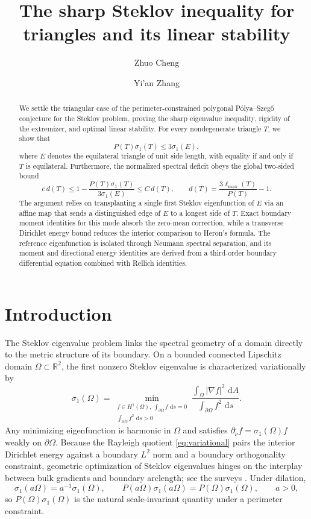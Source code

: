 \documentclass[11pt,reqno]{amsart}
\title[A sharp Steklov inequality for triangles]{The sharp Steklov inequality for triangles and its linear stability}
\author{Zhuo Cheng}
\author{Yi'an Zhang}
\date{}
\numberwithin{equation}{section}
\theoremstyle{remark}
\newcommand{\R}{\mathbb R}
\newcommand{\dd}{\,\mathrm d}
\begin{document}
\begin{abstract}
We settle the triangular case of the perimeter-constrained polygonal
P\'olya--Szeg\H{o} conjecture for the Steklov problem, proving
the sharp eigenvalue inequality, rigidity of the extremizer, and
optimal linear stability. For every nondegenerate triangle $T$, we show that
\[
 P(T)\sigma_1(T)\le 3\sigma_1(E),
\]
where $E$ denotes the equilateral triangle of unit side length, with equality if and only if $T$ is equilateral. Furthermore, the normalized spectral deficit obeys the global two-sided bound
\[
 c\,d(T)\le 1-\frac{P(T)\sigma_1(T)}{3\sigma_1(E)}
 \le C\,d(T),\qquad
 d(T)=\frac{3\ell_{\max}(T)}{P(T)}-1.
\]
The argument relies on transplanting a single first Steklov eigenfunction of $E$ via an affine map that sends a distinguished edge of $E$ to a longest side of $T$. Exact boundary moment identities for this mode absorb the zero-mean correction, while a transverse Dirichlet energy bound reduces the interior comparison to Heron's formula. The reference eigenfunction is isolated through Neumann spectral separation, and its moment and directional energy identities are derived from a third-order boundary differential equation combined with Rellich identities.
\end{abstract}
\maketitle

\section{Introduction}
The Steklov eigenvalue problem links the spectral geometry of a domain
directly to the metric structure of its boundary. On a bounded
connected Lipschitz domain $\Omega\subset\R^2$, the first nonzero
Steklov eigenvalue is characterized variationally by
\begin{equation}\label{eq:variational}
 \sigma_1(\Omega)=
 \min_{\substack{f\in H^1(\Omega),\ \int_{\partial\Omega}f\,\dd s=0\\
                    \int_{\partial\Omega}f^2\,\dd s>0}}
 \frac{\int_\Omega|\nabla f|^2\,\dd A}
      {\int_{\partial\Omega}f^2\,\dd s}.
\end{equation}
Any minimizing eigenfunction is harmonic in $\Omega$ and satisfies
$\partial_\nu f=\sigma_1(\Omega)f$ weakly on $\partial\Omega$.
Because the Rayleigh quotient \eqref{eq:variational} pairs the interior Dirichlet energy against
a boundary $L^2$ norm and a boundary orthogonality constraint, geometric optimization of Steklov
eigenvalues hinges on the interplay between bulk gradients and boundary arclength; see the surveys \cite{GP,CGGS}. Under dilation,
\begin{equation}\label{eq:scaling}
 \sigma_1(a\Omega)=a^{-1}\sigma_1(\Omega),\qquad
 P(a\Omega)\sigma_1(a\Omega)=P(\Omega)\sigma_1(\Omega),\qquad a>0,
\end{equation}
so $P(\Omega)\sigma_1(\Omega)$ is the natural scale-invariant quantity under a perimeter constraint.
\end{document}
